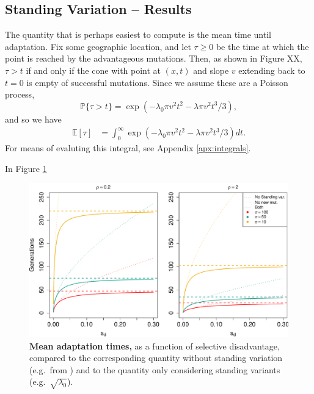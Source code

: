 \documentclass{article}
\renewcommand{\P}{\mathbb{P}}
\newcommand{\E}{\mathbb{E}}
\begin{document}


\subsection{Standing Variation -- Results} 
The quantity that is perhaps easiest to compute is the mean time until adaptation.
Fix some geographic location, and let $\tau\ge0$ be the time at which the point is reached by the advantageous mutations.
Then, as shown in Figure XX,
$\tau > t$ if and only if the cone with point at $(x,t)$ and slope $v$ extending back to $t=0$ is empty of successful mutations.
Since we assume these are a Poisson process, 
\[
    \P\{ \tau > t \} = \exp\left( - \lambda_0 \pi v^2 t^2 - \lambda \pi v^2 t^3 / 3 \right) ,
\]
and so we have
\begin{align}
    \E[\tau] %
        &= \int_0^\infty \exp\left( - \lambda_0 \pi v^2 t^2 - \lambda \pi v^2 t^3 / 3 \right) dt.
\end{align}
For means of evaluting this integral, see Appendix \ref{apx:integrals}.

In Figure \ref{G6PD_chartimes}

\begin{figure}[ht]
\begin{center}
  \includegraphics[width=1.0\textwidth]{G6PD_chartimes}   %
\caption{ %
{\bf Mean adaptation times,} as a function of selective disadvantage, compared to the corresponding quantity without standing variation (e.g.\ from \cite{ralphcoop2010}) and to the quantity only considering standing variants (e.g.\ $\sqrt{\lambda_0}$).
} \label{G6PD_chartimes}
\end{center}
\end{figure}
\end{document}

